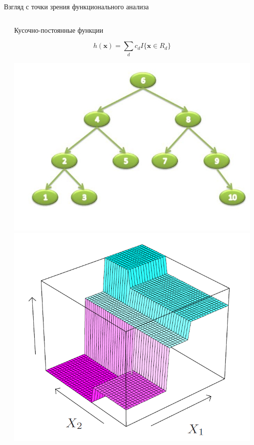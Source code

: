 \documentclass[10pt]{beamer}
\begin{document}
\begin{frame}{Взгляд с точки зрения функционального анализа}
\begin{columns}[C]
\begin{column}{.5\textwidth}
        \end{column}%
        \begin{column}{.5\textwidth}
                \begin{block}{Кусочно-постоянные функции}
                \end{block}
                \[
                    h(\mathbf{x}) = \sum \limits_d c_d  I\{\mathbf{x} \in R_d\}
                \]
                \begin{center}
                    \includegraphics[scale=0.2]{images/tree.jpg}\\
                    \includegraphics[scale=0.1]{images/treesurface.png}
                \end{center}
        \end{column}
\end{columns}
\end{frame}
\end{document}
